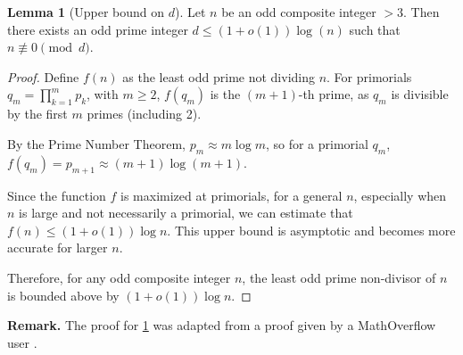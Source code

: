 \documentclass{article}
\theoremstyle{plain}
\theoremstyle{definition}
\newtheorem{lemma}{Lemma}
\begin{document}
\begin{lemma}[Upper bound on $d$] \label{lemma:leastd}
Let $n$ be an odd composite integer $>3$. Then there exists an odd prime integer $d \leq (1 + o(1)) \log(n)$ such that $n \not\equiv 0 \pmod{d}$.
\end{lemma}
\begin{proof}
Define $f(n)$ as the least odd prime not dividing $n$. For primorials $q_m = \prod_{k=1}^m p_k$, with $m \geq 2$, $f(q_m)$ is the $(m+1)$-th prime, as $q_m$ is divisible by the first $m$ primes (including 2).

By the Prime Number Theorem, $p_m \approx m \log m$, so for a primorial $q_m$, $f(q_m) = p_{m+1} \approx (m+1) \log (m+1)$. 

Since the function $f$ is maximized at primorials, for a general $n$, especially when $n$ is large and not necessarily a primorial, we can estimate that $f(n) \leq (1+o(1))\log n$. This upper bound is asymptotic and becomes more accurate for larger $n$.

Therefore, for any odd composite integer $n$, the least odd prime non-divisor of $n$ is bounded above by $(1+o(1))\log n$.
\end{proof}

\textbf{Remark.} The proof for \cref{lemma:leastd} was adapted from a proof given by a MathOverflow user \cite{leastcoprime2021}.
\end{document}
